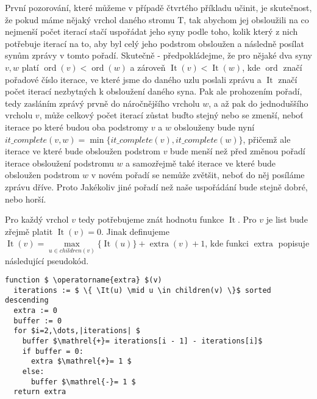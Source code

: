 \documentclass[12pt,a4paper]{article}
\theoremstyle{plain}
\newcommand\addfunctions[1]{%
  \lstset{morekeywords=[4]{#1}}}
\newcommand{\It}{\operatorname{It}}
\begin{document}
\pagestyle{fancy}                      %
\fancyhf{}                             %
\addtolength{\topmargin}{-30 pt}                   %
\setlength{\headsep}{10 pt}                      %
\renewcommand{\headrulewidth}{1 pt}                %

\addfunctions{min_path}

První pozorování, které můžeme v případě čtvrtého příkladu učinit, je skutečnost, že pokud máme nějaký vrchol daného stromu T, tak abychom jej obsloužili na co nejmenší počet iterací stačí uspořádat jeho syny podle toho, kolik který z nich potřebuje iterací na to, aby byl celý jeho podstrom obsloužen a následně posílat synům zprávy v tomto pořadí. Skutečně - předpokládejme, že pro nějaké dva syny $ v, w$  platí $ \operatorname{ord}(v) < \operatorname{ord}(w) $ a zároveň $ \It(v) < \It(w) $, kde $ \operatorname{ord} $ značí pořadové číslo iterace, ve které jsme do daného uzlu poslali zprávu a $ \It $ značí počet iterací nezbytných k obsloužení daného syna. Pak ale prohozením pořadí, tedy zasláním zprávý prvně do náročnějšího vrcholu $ w $, a až pak do jednoduššího vrcholu $ v $, může celkový počet iterací zůstat buďto stejný nebo se zmenší, neboť iterace po které budou oba podstromy $ v $ a $ w $ obslouženy bude nyní $ it\_complete(v, w) = \min\{it\_complete(v), it\_complete(w) \} $, přičemž ale iterace ve které bude obsloužen podstrom $ v $ bude menší než před změnou pořadí iterace obsloužení podstromu $ w $ a samozřejmě také iterace ve které bude obsloužen podstrom $ w $ v novém pořadí se nemůže zvětšit, neboť do něj posíláme zprávu dříve. Proto Jakékoliv jiné pořadí než naše uspořádání bude stejně dobré, nebo horší.


Pro každý vrchol $ v $ tedy potřebujeme znát hodnotu funkce $ \It $. Pro $ v $ je list bude zřejmě platit $ \It(v) = 0 $. Jinak definujeme $ \It(v) = \max\limits_{u \in children(v)}\{\It(u)\} + \operatorname{extra}(v) + 1$, kde funkci $ \operatorname{extra} $ popisuje následující pseudokód.

\begin{lstlisting}[mathescape]
function $ \operatorname{extra} $(v)
  iterations := $ \{ \It(u) \mid u \in children(v) \}$ sorted descending 
  extra := 0 
  buffer := 0 
  for $i=2,\dots,|iterations| $ 
    buffer $\mathrel{+}= iterations[i - 1] - iterations[i]$
    if buffer = 0:
      extra $\mathrel{+}= 1 $
    else:
      buffer $\mathrel{-}= 1 $
  return extra
\end{lstlisting}
\end{document}

